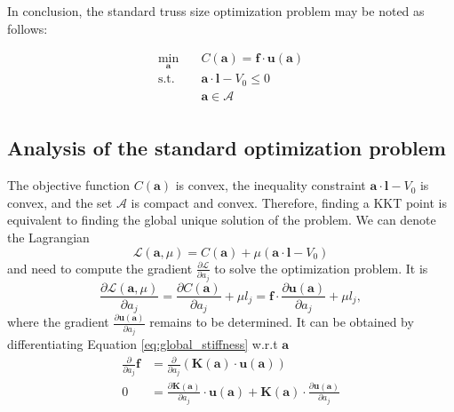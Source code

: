 In conclusion, the standard truss size optimization problem may be noted as follows:

\begin{equation}
    \begin{aligned}
        \min_{\mathbf{a}} \quad & C(\mathbf{a}) = \mathbf{f} \cdot \mathbf{u}(\mathbf{a})\\
        \textrm{s.t.} \quad & \mathbf{a} \cdot \mathbf{l} - V_0 \le 0  \\
                            & \mathbf{a} \in \mathcal{A}\\
    \end{aligned}
    \label{eq:size_optimization}
\end{equation}

\subsection{Analysis of the standard optimization problem}
The objective function $C(\mathbf{a})$ is convex, the inequality constraint $\mathbf{a} \cdot \mathbf{l} - V_0$ is convex, and the set $\mathcal{A}$ is compact and convex. Therefore, finding a KKT point is equivalent to finding the global unique solution of the problem. We can denote the Lagrangian 
\begin{equation}
    \mathcal{L}(\mathbf{a}, \mu) = C(\mathbf{a}) + \mu \left( \mathbf{a} \cdot \mathbf{l} - V_0 \right) 
\end{equation}
and need to compute the gradient $\frac{\partial \mathcal{L}}{\partial a_j}$ to solve the optimization problem. It is 
\begin{equation}
    \frac{\partial \mathcal{L} (\mathbf{a}, \mu)}{\partial a_j} 
    = \frac{\partial C (\mathbf{a})}{\partial a_j} + \mu l_j
    = \mathbf{f} \cdot \frac{\partial \mathbf{u} (\mathbf{a})}{\partial a_j} + \mu l_j,
    \label{eq:lagrange_truss_problem}
\end{equation}
where the gradient $\frac{\partial \mathbf{u} (\mathbf{a})}{\partial a_j}$ remains to be determined. It can be obtained by differentiating Equation \eqref{eq:global_stiffness} w.r.t $\mathbf{a}$
\begin{align}
        \frac{\partial}{\partial a_j} \mathbf{f} &= \frac{\partial}{\partial a_j} \left( \mathbf{K} (\mathbf{a}) \cdot \mathbf{u} (\mathbf{a}) \right) \\
        0 &= \frac{\partial \mathbf{K} (\mathbf{a})}{\partial a_j} \cdot \mathbf{u} (\mathbf{a}) + \mathbf{K} (\mathbf{a}) \cdot \frac{\partial \mathbf{u} (\mathbf{a})}{\partial a_j}
\end{align}
